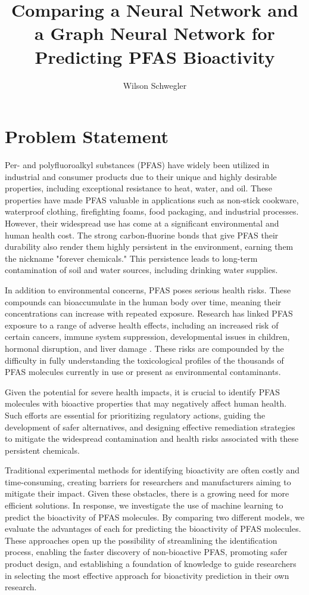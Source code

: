 \documentclass[10pt,twocolumn]{article}
\title{Comparing a Neural Network and a Graph Neural Network for Predicting PFAS Bioactivity}
\author{Wilson Schwegler}
\affiliation{Occidental College}
\begin{document}
\maketitle

\section{Problem Statement}

Per- and polyfluoroalkyl substances (PFAS) have widely been utilized in industrial and consumer products due to their unique and highly desirable properties, including exceptional resistance to heat, water, and oil. These properties have made PFAS valuable in applications such as non-stick cookware, waterproof clothing, firefighting foams, food packaging, and industrial processes. However, their widespread use has come at a significant environmental and human health cost. The strong carbon-fluorine bonds that give PFAS their durability also render them highly persistent in the environment, earning them the nickname "forever chemicals." This persistence leads to long-term contamination of soil and water sources, including drinking water supplies.

In addition to environmental concerns, PFAS poses serious health risks. These compounds can bioaccumulate in the human body over time, meaning their concentrations can increase with repeated exposure. Research has linked PFAS exposure to a range of adverse health effects, including an increased risk of certain cancers, immune system suppression, developmental issues in children, hormonal disruption, and liver damage \textcite{acumulate}. These risks are compounded by the difficulty in fully understanding the toxicological profiles of the thousands of PFAS molecules currently in use or present as environmental contaminants.

Given the potential for severe health impacts, it is crucial to identify PFAS molecules with bioactive properties that may negatively affect human health. Such efforts are essential for prioritizing regulatory actions, guiding the development of safer alternatives, and designing effective remediation strategies to mitigate the widespread contamination and health risks associated with these persistent chemicals.

Traditional experimental methods for identifying bioactivity are often costly and time-consuming, creating barriers for researchers and manufacturers aiming to mitigate their impact. Given these obstacles, there is a growing need for more efficient solutions. In response, we investigate the use of machine learning to predict the bioactivity of PFAS molecules. By comparing two different models, we evaluate the advantages of each for predicting the bioactivity of PFAS molecules. These approaches open up the possibility of streamlining the identification process, enabling the faster discovery of non-bioactive PFAS, promoting safer product design, and establishing a foundation of knowledge to guide researchers in selecting the most effective approach for bioactivity prediction in their own research. 
\end{document}

